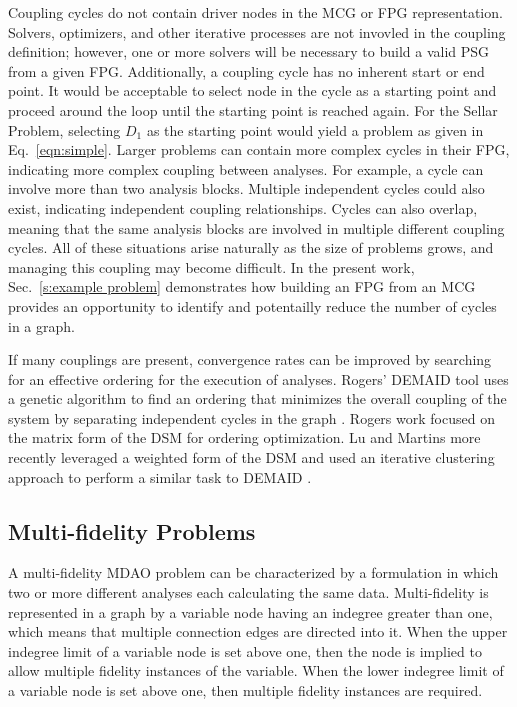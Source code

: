   Coupling cycles do not contain driver nodes in the MCG or FPG representation. 
  Solvers, optimizers, and other iterative processes are not invovled in the coupling 
  definition; however, one or more solvers will be necessary to build a valid PSG from a given FPG. 
  Additionally, a coupling cycle has no inherent start or end point. It would be acceptable to select
  node in the cycle as a starting point and proceed around the
  loop until the starting point is reached again. For the Sellar Problem, selecting 
  $D_1$ as the starting point would yield a problem as given in 
  Eq.~\ref{eqn:simple}.
  Larger problems can contain more complex cycles in their FPG, indicating more 
  complex coupling between analyses. For example, a cycle can involve more than 
   two analysis blocks. Multiple independent cycles could also exist, indicating 
  independent coupling relationships. Cycles can also overlap, meaning that the same analysis 
  blocks are involved in multiple different coupling cycles. All of these situations
  arise naturally as the size of problems grows, and managing this coupling may
  become difficult. In the present work, Sec.~\ref{s:example problem}
  demonstrates how building an FPG from an MCG provides an opportunity to 
  identify and potentailly reduce the number of cycles in a graph. 

  If many couplings are present, convergence rates can be improved by 
  searching for an effective ordering for the execution of analyses.
  Rogers' DEMAID tool uses a genetic algorithm to find an ordering that minimizes 
  the overall coupling of the system by separating independent cycles in the 
  graph \cite{rogers1996,rogers1996demaid}. Rogers work focused on the matrix 
  form of the DSM for ordering optimization. Lu and Martins more recently leveraged 
  a weighted form of the DSM and used an iterative clustering approach to perform a 
  similar task to DEMAID \cite{Lu2012}.

\subsection{Multi-fidelity Problems}
  \label{ss:multi-fideliy problems}
  A multi-fidelity MDAO problem can be characterized by a formulation in which 
  two or more different analyses each calculating the same data. Multi-fidelity 
  is represented in a graph by a variable node having an indegree greater than 
  one, which means that multiple connection edges are directed into it. When the 
  upper indegree limit of a variable node is set above one, then the node is 
  implied to allow multiple fidelity instances of the variable. When the lower 
  indegree limit of a variable node is set above one, then multiple fidelity instances are required.

